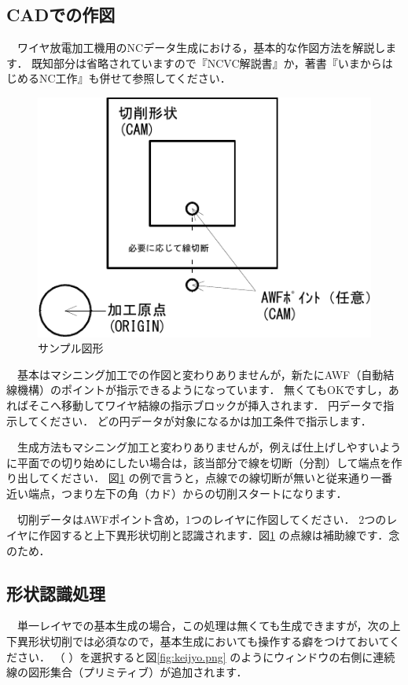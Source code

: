 

\subsection{CADでの作図}
　ワイヤ放電加工機用のNCデータ生成における，基本的な作図方法を解説します．
既知部分は省略されていますので『NCVC解説書』か，著書『いまからはじめるNC工作』も併せて参照してください．

\begin{figure}[H]
\centering
\includegraphics{No1/fig/sample1-crop.pdf}
\caption{サンプル図形}
\label{fig:sample1.pdf}
\end{figure}

　基本はマシニング加工での作図と変わりありませんが，新たにAWF（自動結線機構）のポイントが指示できるようになっています．
無くてもOKですし，あればそこへ移動してワイヤ結線の指示ブロックが挿入されます．
円データで指示してください．
どの円データが対象になるかは加工条件で指示します．

　生成方法もマシニング加工と変わりありませんが，例えば仕上げしやすいように平面での切り始めにしたい場合は，該当部分で線を切断（分割）して端点を作り出してください．
図\ref{fig:sample1.pdf} の例で言うと，点線での線切断が無いと従来通り一番近い端点，つまり左下の角（カド）からの切削スタートになります．

　切削データはAWFポイント含め，1つのレイヤに作図してください．
2つのレイヤに作図すると上下異形状切削と認識されます．図\ref{fig:sample1.pdf} の点線は補助線です．念のため．

\newpage %
\subsection{形状認識処理}
　単一レイヤでの基本生成の場合，この処理は無くても生成できますが，次の上下異形状切削では必須なので，基本生成においても操作する癖をつけておいてください．
（\,\,）を選択すると図\ref{fig:keijyo.png} のようにウィンドウの右側に連続線の図形集合（プリミティブ）が追加されます．

